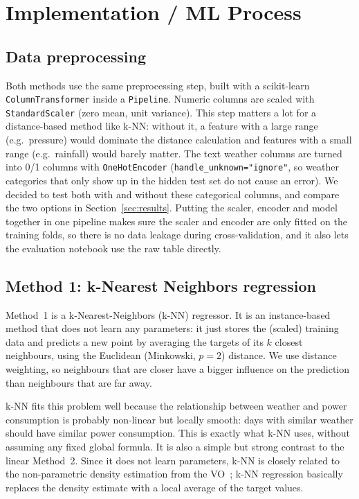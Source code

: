 \documentclass[a4, 10 pt, conference]{ieeeconf}  %
\begin{document}
\section{Implementation / ML Process}
\label{sec:methods}

\subsection*{Data preprocessing}
Both methods use the same preprocessing step, built with a scikit-learn
\texttt{ColumnTransformer} inside a \texttt{Pipeline}. Numeric columns are
scaled with \texttt{StandardScaler} (zero mean, unit variance). This step
matters a lot for a distance-based method like k-NN: without it, a feature
with a large range (e.g.\ pressure) would dominate the distance calculation
and features with a small range (e.g.\ rainfall) would barely matter. The
text weather columns are turned into 0/1 columns with \texttt{OneHotEncoder}
(\texttt{handle\_unknown="ignore"}, so weather categories that only show up in
the hidden test set do not cause an error). We decided to test both with and
without these categorical columns, and compare the two options in
Section~\ref{sec:results}. Putting the scaler, encoder and model together in
one pipeline makes sure the scaler and encoder are only fitted on the
training folds, so there is no data leakage during cross-validation, and it
also lets the evaluation notebook use the raw table directly.

\subsection*{Method 1: k-Nearest Neighbors regression}
Method~1 is a k-Nearest-Neighbors (k-NN) regressor. It is an instance-based
method that does not learn any parameters: it just stores the (scaled)
training data and predicts a new point by averaging the targets of its $k$
closest neighbours, using the Euclidean (Minkowski, $p=2$) distance. We use
distance weighting, so neighbours that are closer have a bigger influence on
the prediction than neighbours that are far away.

k-NN fits this problem well because the relationship between weather and
power consumption is probably non-linear but locally smooth: days with
similar weather should have similar power consumption. This is exactly what
k-NN uses, without assuming any fixed global formula. It is also a simple but
strong contrast to the linear Method~2. Since it does not learn parameters,
k-NN is closely related to the non-parametric density estimation from the
VO~\cite{vo-nonparam}; k-NN regression basically replaces the density
estimate with a local average of the target values.
\end{document}
